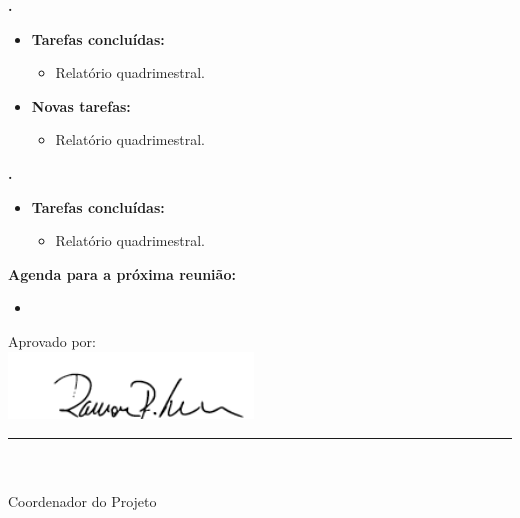   \textbf{\renan.} 
	\begin{itemize}
		\item \textbf{Tarefas concluídas:}
			\begin{itemize}    
			\item Relatório quadrimestral.
			\end{itemize}
		
		\item \textbf{Novas tarefas:}
			\begin{itemize} 
			\item Relatório quadrimestral.
			\end{itemize}
	\end{itemize}	
			
   \textbf{\julia.} 
	\begin{itemize}
		\item \textbf{Tarefas concluídas:}
			\begin{itemize}    
				\item Relatório quadrimestral.
			\end{itemize}
		
	\end{itemize}		



\textbf{Agenda para a próxima reunião:}
  \begin{itemize}
    \item 
  \end{itemize}


\vspace{5mm}%
\parbox[t]{70mm}{
  Aprovado por: \\[5mm]
  \centering
  \includegraphics[width=65mm]{figs/logo/assinatura-ramon.png} \\[-4mm]
  \rule[2mm]{70mm}{0.1mm} \\
  \ramon \\[1mm]
  Coordenador do Projeto \\
}

\fim